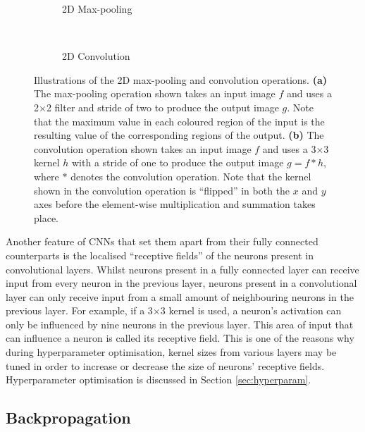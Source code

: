 \begin{figure}[t]
    \centering
    \begin{subfigure}[t]{0.43\textwidth}
        \centering
        
    \vspace*{1mm}
    \caption{2D Max-pooling}
    \end{subfigure}
    ~
    \begin{subfigure}[t]{0.55\textwidth}
        \centering
        
        \vspace*{1mm}
        \caption{2D Convolution}
    \end{subfigure}
    \caption{Illustrations of the 2D max-pooling and convolution operations. \textbf{(a)} The max-pooling operation shown takes an input image $f$ and uses a 2$\times$2 filter and stride of two to produce the output image $g$. Note that the maximum value in each coloured region of the input is the resulting value of the corresponding regions of the output. \textbf{(b)} The convolution operation shown takes an input image $f$ and uses a 3$\times$3 kernel $h$ with a stride of one to produce the output image $g=f\ast h$, where $\ast$ denotes the convolution operation. Note that the kernel shown in the convolution operation is ``flipped'' in both the $x$ and $y$ axes before the element-wise multiplication and summation takes place.}
    \label{fig:operations}
\end{figure}

Another feature of CNNs that set them apart from their fully connected counterparts is the localised ``receptive fields'' of the neurons present in convolutional layers. Whilst neurons present in a fully connected layer can receive input from every neuron in the previous layer, neurons present in a convolutional layer can only receive input from a small amount of neighbouring neurons in the previous layer. For example, if a 3$\times$3 kernel is used, a neuron's activation can only be influenced by nine neurons in the previous layer. This area of input that can influence a neuron is called its receptive field. This is one of the reasons why during hyperparameter optimisation, kernel sizes from various layers may be tuned in order to increase or decrease the size of neurons' receptive fields. Hyperparameter optimisation is discussed in Section \ref{sec:hyperparam}.

\subsection{Backpropagation}
\label{sec:backprop}

